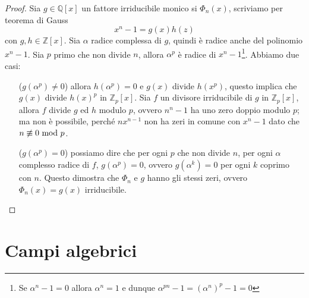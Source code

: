 \begin{proof}
	Sia $g\in\mathbb{Q}[x]$ un fattore irriducibile monico si $\Phi_n(x)$, scriviamo per teorema di Gauss
	\begin{equation*}
	x^n-1=g(x)h(z)
	\end{equation*}
	con $g,h\in\mathbb{Z}[x]$. Sia $\alpha$ radice complessa di $g$, quindi è radice anche del polinomio $x^n-1$. Sia $p$ primo che non divide $n$, allora $\alpha^p$ è radice di $x^n-1$\footnote{Se $\alpha^n-1 = 0$ allora $\alpha^n = 1$ e dunque $\alpha^{pn} - 1 = (\alpha^n)^p - 1 = 0$}. Abbiamo due casi:
	\begin{itemize} 
		\item[($g(\alpha^p)\neq0$)] allora $h(\alpha^p)=0$ e $g(x)$ divide $h(x^p)$, questo implica che $g(x)$ divide $h(x)^p$ in $\mathbb{Z}_p[x]$. Sia $f$ un divisore irriducibile di $g$ in $\mathbb{Z}_p[x]$, allora $f$ divide $g$ ed $h$ modulo $p$, ovvero $n^n-1$ ha uno zero doppio modulo $p$; ma non è possibile, perché $nx^{n-1}$ non ha zeri in comune con $x^n-1$ dato che $n\not\equiv0\ \mathrm{mod}\ p$.
		\item[($g(\alpha^p)=0$)] possiamo dire che per ogni $p$ che non divide $n$, per ogni $\alpha$ complesso radice di $f$, $g(\alpha^p)=0$, ovvero $g(\alpha^k)=0$ per ogni $k$ coprimo con $n$. Questo dimostra che $\Phi_n$ e $g$ hanno gli stessi zeri, ovvero $\Phi_n(x)=g(x)$ irriducibile.
	\end{itemize}
\end{proof}




\section{Campi algebrici}

